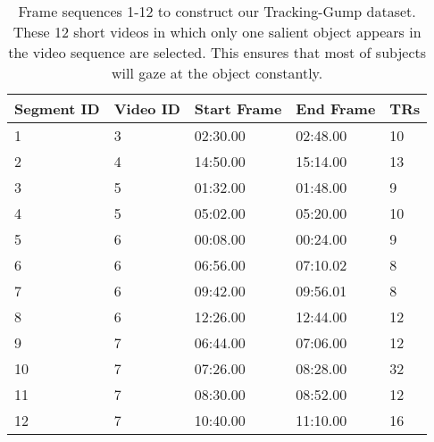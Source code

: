 \documentclass[final,3p,times,twocolumn]{elsarticle}
\begin{document}
\begin{table}[h]
	\centering
	\footnotesize
	\caption{Frame sequences 1-12 to construct our Tracking-Gump dataset.
	These 12 short videos in which only one salient object appears in the video sequence are selected. 
	This ensures that most of subjects will gaze at the object constantly.}
	
	\label{tab:track_seg}
	
	\begin{tabular}{p{1.0cm}<{\centering}p{0.9cm}<{\centering}p{1.6cm}<{\centering}p{1.5cm}<{\centering}p{0.7cm}<{\centering}}
		\toprule[1.5pt]
		Segment ID & Video ID  & Start Frame    & End Frame  & TRs   \\ \midrule[1pt]
		1     		  & 3 			   & 02:30.00 	   & 02:48.00  & 10  		  \\
		2  	 		  & 4 			   & 14:50.00 	   & 15:14.00  & 13   		  \\
		3   		  & 5 			   & 01:32.00 	   & 01:48.00  & 9   		  \\
		4   		  & 5 			   & 05:02.00  	   & 05:20.00  & 10   		  \\
		5   		  & 6 			   & 00:08.00 	   & 00:24.00  & 9   		  \\
		6   		  & 6 			   & 06:56.00 	   & 07:10.02  & 8   		  \\
		7   		  & 6 			   & 09:42.00  	   & 09:56.01  & 8   		  \\
		8   		  & 6 			   & 12:26.00 	   & 12:44.00  & 12		      \\
		9   		  & 7  			   & 06:44.00 	   & 07:06.00  & 12		      \\
		10  		  & 7 			   & 07:26.00 	   & 08:28.00  & 32		      \\
		11  		  & 7 			   & 08:30.00 	   & 08:52.00  & 12		      \\
		12 			  & 7 			   & 10:40.00 	   & 11:10.00  & 16		      \\
		\bottomrule[1.5pt]
	\end{tabular}
	
\end{table}
\end{document}
